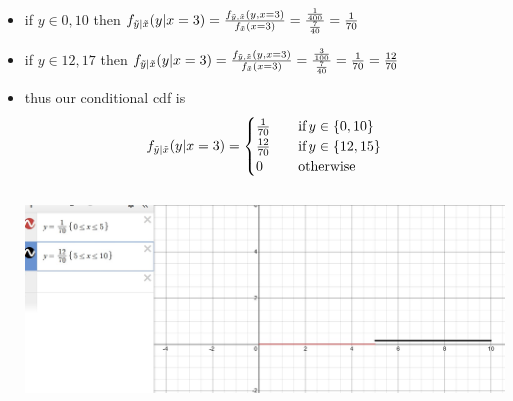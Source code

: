 \documentclass[12pt,twoside]{article}
\begin{document}
\begin{enumerate}
\begin{enumerate}
\begin{itemize}
    \item if $y\in{0,10}$ then $f_{\Tilde{y}|\Tilde{x}}(y|x=3)=\frac{f_{\Tilde{y},\Tilde{x}}(y,x=3)}{f_{\Tilde{x}}(x=3)}=\frac{\frac{1}{400}}{\frac{7}{40}}=\frac{1}{70}$
        \item if $y\in{12,17}$ then $f_{\Tilde{y}|\Tilde{x}}(y|x=3)=\frac{f_{\Tilde{y},\Tilde{x}}(y,x=3)}{f_{\Tilde{x}}(x=3)}=\frac{\frac{3}{100}}{\frac{7}{40}}=\frac{1}{70}=\frac{12}{70}$
        \item thus our conditional cdf is 
    \begin{equation*}
f_{\Tilde{y}|\Tilde{x}}(y|x=3)=\begin{cases}
          \frac{1}{70} \quad &\text{if} \, y \in \{0,10\} \\
                \frac{12}{70} \quad &\text{if} \, y \in \{12,15\}\\
                0 \quad & \text{otherwise}
     \end{cases}
\end{equation*}
\\\includegraphics[width=15cm]{homework 7/question 2c.jpg}
\end{itemize}





\end{enumerate}
\end{enumerate}
\end{document}
